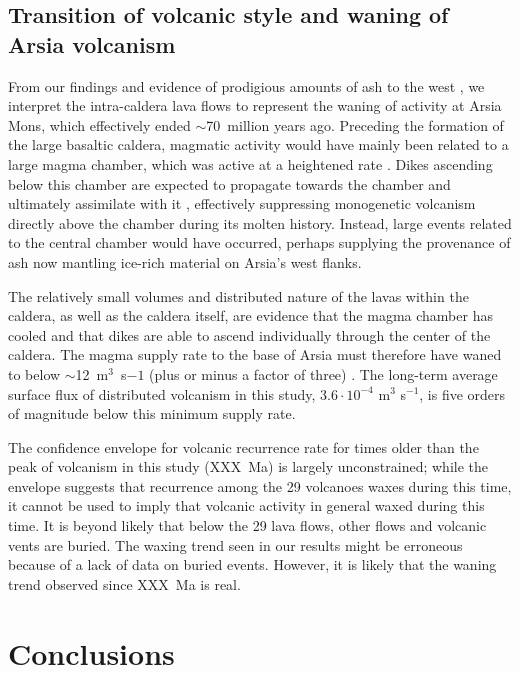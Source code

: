 \documentclass[12pt,letter]{article}
\begin{document}
\subsection{Transition of volcanic style and waning of Arsia volcanism}
From our findings and evidence of prodigious amounts of ash to the west \citep{mouginis2002prodigious}, we interpret the intra-caldera lava flows to represent the waning of activity at Arsia Mons, which effectively ended $\sim$70~million years ago. Preceding the formation of the large basaltic caldera, magmatic activity would have mainly been related to a large magma chamber, which was active at a heightened rate \citep{wilson2001evidence}. Dikes ascending below this chamber are expected to propagate towards the chamber and ultimately assimilate with it \citep{karlstrom2009organization}, effectively suppressing monogenetic volcanism directly above the chamber during its molten history. Instead, large events related to the central chamber would have occurred, perhaps supplying the provenance of ash now mantling ice-rich material on Arsia's west flanks.

The relatively small volumes and distributed nature of the lavas within the caldera, as well as the caldera itself, are evidence that the magma chamber has cooled and that dikes are able to ascend individually through the center of the caldera. The magma supply rate to the base of Arsia must therefore have waned to below $\sim$12~m$^3$~s$-1$ (plus or minus a factor of three) \citep{wilson2001evidence}. The long-term average surface flux of distributed volcanism in this study, $3.6\cdot 10^{-4}$ m$^3$ s$^{-1}$, is five orders of magnitude below this minimum supply rate.

The confidence envelope for volcanic recurrence rate for times older than the peak of volcanism in this study (XXX~Ma) is largely unconstrained; while the envelope suggests that recurrence among the 29 volcanoes waxes during this time, it cannot be used to imply that volcanic activity in general waxed during this time. It is beyond likely that below the 29 lava flows, other flows and volcanic vents are buried. The waxing trend seen in our results might be erroneous because of a lack of data on buried events. However, it is likely that the waning trend observed since XXX~Ma is real.

\section{Conclusions}
\end{document}
